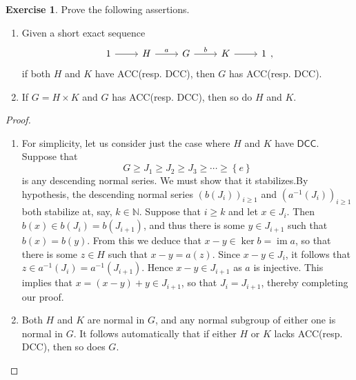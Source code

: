 \documentclass[10pt,letterpaper,cm]{nupset}
\theoremstyle{definition}
\theoremstyle{theorem}
\newtheorem{exercise}[definition]{Exercise}
\theoremstyle{remark}
\newcommand{\N}{\mathbb N}
\newcommand{\1}{\mathbf{1}}
\newcommand{\0}{\vec 0}
\newcommand{\dcc}{\textsf{DCC}\xspace}
\newcommand{\acc}{\textsf{ACC}\xspace}
\DeclareMathOperator{\im}{im}
\begin{document}
\begin{exercise} Prove the following assertions.
\begin{enumerate}
\item Given a short exact sequence 
\[
\begin{tikzcd}
1 \arrow[r] & H \arrow[r, "a"] & G \arrow[r, "b"] & K \arrow[r] & 1
\end{tikzcd},
\] if both $H$ and $K$ have \acc (resp. \dcc), then $G$ has \acc (resp. \dcc). 
\item If $G = H \times K$ and $G$ has \acc (resp. \dcc), then so do $H$ and $K$.
\end{enumerate}
\begin{proof} $ $ 
\begin{enumerate}
\item For simplicity, let us consider just the case where $H$ and $K$ have $\dcc$. Suppose that 
\[
G \geq J_1 \geq J_2 \geq J_3 \geq \cdots \geq \left\{e\right\}
\] is any descending normal series. We must show that it stabilizes.By hypothesis, the descending normal series $\left(b(J_i)\right)_{i\geq 1}$ and $\left(a^{-1}(J_i)\right)_{i\geq 1}$ both stabilize at, say, $k\in \N$. Suppose that $i\geq k$ and let $x \in J_i$. Then $b(x) \in  b(J_i)= b(J_{i+1})$, and thus there is some $y\in J_{i+1}$ such that $b(x) = b(y)$. From this we deduce that $x-y \in \ker{b} = \im{a}$, so that there is some $z\in H$ such that $x-y = a(z)$. Since $x-y \in J_i$, it follows that $z \in a^{-1}(J_i) = a^{-1}(J_{i+1})$. Hence $x-y\in J_{i+1}$ as $a$ is injective. This implies that $x = \left(x-y\right)+y \in J_{i+1}$, so that $J_i = J_{i+1}$, thereby completing our proof.
\item Both $H$ and $K$ are normal in $G$, and any normal subgroup of either one is normal in $G$. It follows automatically that if either $H$ or $K$ lacks \acc  (resp. \dcc), then so does $G$.
\end{enumerate}
\end{proof}
\end{exercise}
\end{document}
